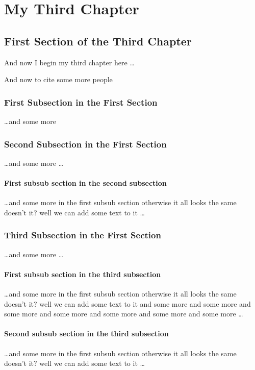 \chapter{My Third Chapter}

\section{First Section of the Third Chapter}
And now I begin my third chapter here \dots

And now to cite some more people~\citet{Rea85}

\subsection{First Subsection in the First Section}
\dots and some more 

\subsection{Second Subsection in the First Section}
\dots and some more \dots

\subsubsection{First subsub section in the second subsection}
\dots and some more in the first subsub section otherwise it all looks the same
doesn't it? well we can add some text to it \dots

\subsection{Third Subsection in the First Section}
\dots and some more \dots

\subsubsection{First subsub section in the third subsection}
\dots and some more in the first subsub section otherwise it all looks the same
doesn't it? well we can add some text to it and some more and some more and
some more and some more and some more and some more and some more \dots

\subsubsection{Second subsub section in the third subsection}
\dots and some more in the first subsub section otherwise it all looks the same
doesn't it? well we can add some text to it \dots


